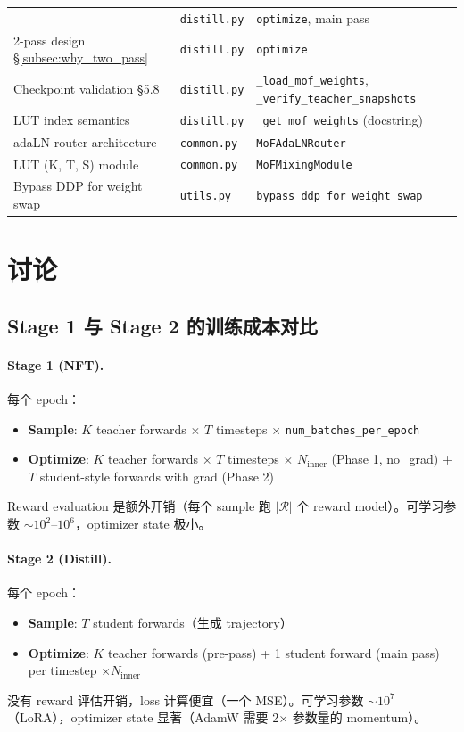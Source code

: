 \documentclass[11pt,a4paper]{article}
\theoremstyle{definition}
\begin{document}
\begin{center}
\begin{tabular}{@{}p{6.5cm} l p{4cm}@{}}
  & \texttt{distill.py} & \texttt{optimize}, main pass \\
2-pass design \S\ref{subsec:why_two_pass}
  & \texttt{distill.py} & \texttt{optimize} \\
Checkpoint validation \S 5.8
  & \texttt{distill.py} & \texttt{\_load\_mof\_weights}, \texttt{\_verify\_teacher\_snapshots} \\
LUT index semantics
  & \texttt{distill.py} & \texttt{\_get\_mof\_weights} (docstring) \\
\midrule
adaLN router architecture
  & \texttt{common.py} & \texttt{MoFAdaLNRouter} \\
LUT (K, T, S) module
  & \texttt{common.py} & \texttt{MoFMixingModule} \\
Bypass DDP for weight swap
  & \texttt{utils.py} & \texttt{bypass\_ddp\_for\_weight\_swap} \\
\bottomrule
\end{tabular}
\end{center}

\section{讨论}
\label{sec:discussion}

\subsection{Stage 1 与 Stage 2 的训练成本对比}

\paragraph{Stage 1 (NFT).} 每个 epoch：
\begin{itemize}[leftmargin=1.5em]
\item \textbf{Sample}: $K$ teacher forwards $\times$ $T$ timesteps $\times$ \texttt{num\_batches\_per\_epoch}
\item \textbf{Optimize}: $K$ teacher forwards $\times$ $T$ timesteps $\times$ $N_{\text{inner}}$
  (Phase 1, no\_grad) + $T$ student-style forwards with grad (Phase 2)
\end{itemize}
Reward evaluation 是额外开销（每个 sample 跑 $|\mathcal{R}|$ 个 reward
model）。可学习参数 $\sim 10^2$--$10^6$，optimizer state 极小。

\paragraph{Stage 2 (Distill).} 每个 epoch：
\begin{itemize}[leftmargin=1.5em]
\item \textbf{Sample}: $T$ student forwards（生成 trajectory）
\item \textbf{Optimize}: $K$ teacher forwards (pre-pass) + 1 student forward (main pass) per timestep $\times N_{\text{inner}}$
\end{itemize}
没有 reward 评估开销，loss 计算便宜（一个 MSE）。可学习参数 $\sim 10^7$
（LoRA），optimizer state 显著（AdamW 需要 2$\times$ 参数量的 momentum）。
\end{document}
